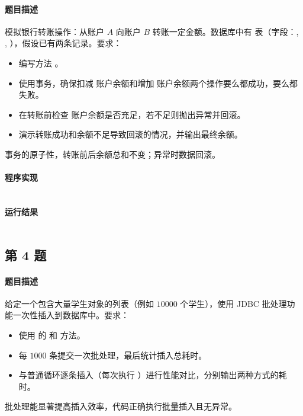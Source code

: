\documentclass{academics}
\begin{document}
\paragraph{题目描述} {
    模拟银行转账操作：从账户 $A$ 向账户 $B$ 转账一定金额。数据库中有  表（字段：, , ），假设已有两条记录。要求：
    \begin{itemize}
        \item 编写方法 。
        \item 使用事务，确保扣减  账户余额和增加  账户余额两个操作要么都成功，要么都失败。
        \item 在转账前检查  账户余额是否充足，若不足则抛出异常并回滚。
        \item 演示转账成功和余额不足导致回滚的情况，并输出最终余额。
    \end{itemize}
    事务的原子性，转账前后余额总和不变；异常时数据回滚。
}

\paragraph{程序实现} {
    \inputminted[label=BankTransfer.java]{java}{../src/P03/BankTransfer.java}
}

\paragraph{运行结果} {
    \inputminted{text}{../res/P03.out}
}

\subsection{第 4 题}

\paragraph{题目描述} {
    给定一个包含大量学生对象的列表（例如 $10000$ 个学生），使用 JDBC 批处理功能一次性插入到数据库中。要求：
    \begin{itemize}
        \item 使用  的  和  方法。
        \item 每 $1000$ 条提交一次批处理，最后统计插入总耗时。
        \item 与普通循环逐条插入（每次执行 ）进行性能对比，分别输出两种方式的耗时。
    \end{itemize}
    批处理能显著提高插入效率，代码正确执行批量插入且无异常。
}
\end{document}

